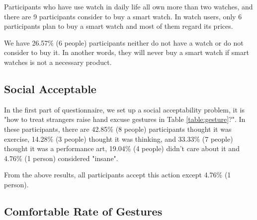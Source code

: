 Participants who have use watch in daily life all own more than two watches, and there are 9 participants consider to buy a smart watch. In watch users, only 6 participants plan to buy a smart watch and most of them regard its prices.

We have 26.57\% (6 people) participants neither do not have a watch or do not consider to buy it. In another words, they will never buy a smart watch if smart watches is not a necessary product.


\subsection{Social Acceptable}

In the first part of questionnaire, we set up a social acceptability problem, it is "how to treat strangers raise hand excuse gestures in Table \ref{table:gesture}?". In these participants, there are 42.85\% (8 people) participants thought it was exercise, 14.28\% (3 people) thought it was thinking, and 33.33\% (7 people) thought it was a performance art, 19.04\% (4 people) didn't care about it and 4.76\% (1 person) considered "insane".

From the above results, all participants accept this action except 4.76\% (1 person).

\subsection{Comfortable Rate of Gestures}

